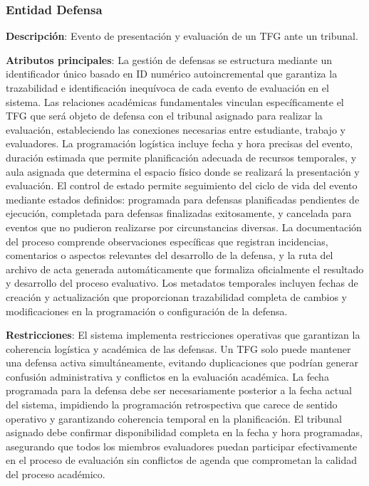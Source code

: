 \documentclass[12pt,a4paper,oneside]{report}
\begin{document}
\subsubsection{Entidad Defensa}\label{entidad-defensa}

\textbf{Descripción}: Evento de presentación y evaluación de un TFG ante
un tribunal.

\textbf{Atributos principales}: La gestión de defensas se estructura mediante un identificador único basado en ID numérico autoincremental que garantiza la trazabilidad e identificación inequívoca de cada evento de evaluación en el sistema. Las relaciones académicas fundamentales vinculan específicamente el TFG que será objeto de defensa con el tribunal asignado para realizar la evaluación, estableciendo las conexiones necesarias entre estudiante, trabajo y evaluadores. La programación logística incluye fecha y hora precisas del evento, duración estimada que permite planificación adecuada de recursos temporales, y aula asignada que determina el espacio físico donde se realizará la presentación y evaluación. El control de estado permite seguimiento del ciclo de vida del evento mediante estados definidos: programada para defensas planificadas pendientes de ejecución, completada para defensas finalizadas exitosamente, y cancelada para eventos que no pudieron realizarse por circunstancias diversas. La documentación del proceso comprende observaciones específicas que registran incidencias, comentarios o aspectos relevantes del desarrollo de la defensa, y la ruta del archivo de acta generada automáticamente que formaliza oficialmente el resultado y desarrollo del proceso evaluativo. Los metadatos temporales incluyen fechas de creación y actualización que proporcionan trazabilidad completa de cambios y modificaciones en la programación o configuración de la defensa.

\textbf{Restricciones}: El sistema implementa restricciones operativas que garantizan la coherencia logística y académica de las defensas. Un TFG solo puede mantener una defensa activa simultáneamente, evitando duplicaciones que podrían generar confusión administrativa y conflictos en la evaluación académica. La fecha programada para la defensa debe ser necesariamente posterior a la fecha actual del sistema, impidiendo la programación retrospectiva que carece de sentido operativo y garantizando coherencia temporal en la planificación. El tribunal asignado debe confirmar disponibilidad completa en la fecha y hora programadas, asegurando que todos los miembros evaluadores puedan participar efectivamente en el proceso de evaluación sin conflictos de agenda que comprometan la calidad del proceso académico.
\end{document}

